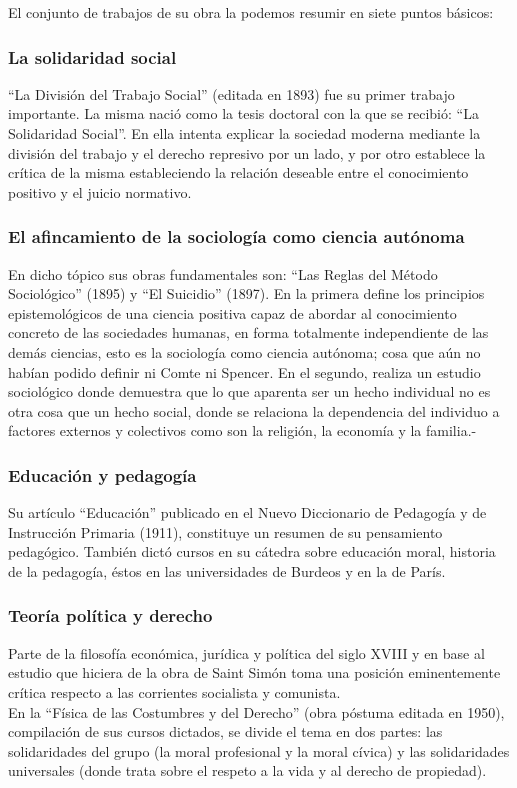 El conjunto de trabajos de su obra la podemos resumir en siete puntos básicos:
\subsubsection{La solidaridad social}
		``La División del Trabajo Social'' (editada en 1893) fue su primer trabajo importante.
		La misma nació como la tesis doctoral con la que se recibió: ``La Solidaridad Social''.
		En ella intenta explicar la sociedad moderna mediante la división del trabajo y el derecho
		represivo por un lado, y por otro establece la crítica de la misma estableciendo la relación
		deseable entre el conocimiento positivo y el juicio normativo.
\subsubsection{El afincamiento de la sociología como ciencia autónoma}
		En dicho tópico sus obras fundamentales son: ``Las Reglas del Método Sociológico'' (1895) y ``El Suicidio'' (1897).
		En la primera define los principios epistemológicos de una ciencia positiva capaz de abordar al conocimiento
		concreto de las sociedades humanas, en forma totalmente independiente de las demás ciencias, esto es la sociología
		como ciencia autónoma; cosa que aún no habían podido definir ni Comte ni Spencer.
		En el segundo, realiza un estudio sociológico donde demuestra que lo que aparenta ser un hecho individual no es otra
		cosa que un hecho social, donde se relaciona la dependencia del individuo a factores externos y colectivos como son
		la religión, la economía y la familia.-
\subsubsection{Educación y pedagogía}
		Su artículo ``Educación'' publicado en el Nuevo Diccionario de Pedagogía y de Instrucción Primaria (1911),
		constituye un resumen de su pensamiento pedagógico. También dictó cursos en su cátedra sobre educación moral,
		historia de la pedagogía, éstos en las universidades de Burdeos y en la de París.
\subsubsection{Teoría política y derecho}
		Parte de la filosofía económica, jurídica y política del siglo XVIII y en base al estudio que hiciera de la obra
		de Saint Simón toma una posición eminentemente crítica respecto a las corrientes socialista y comunista.\\
		En la ``Física de las Costumbres y del Derecho'' (obra póstuma editada en 1950), compilación de sus cursos dictados,
		se divide el tema en dos partes: las solidaridades del grupo (la moral profesional y la moral cívica) y las solidaridades
		universales (donde trata sobre el respeto a la vida y al derecho de propiedad).
